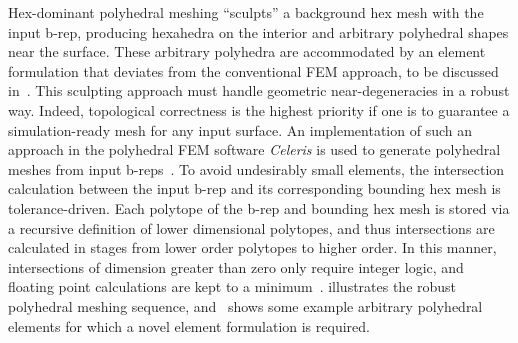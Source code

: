 Hex-dominant polyhedral meshing ``sculpts'' a background hex mesh with the input b-rep, producing hexahedra on the interior and arbitrary polyhedral shapes near the surface. These arbitrary polyhedra are accommodated by an element formulation that deviates from the conventional FEM approach, to be discussed in~. This sculpting approach must handle geometric near-degeneracies in a robust way. Indeed, topological correctness is the highest priority if one is to guarantee a simulation-ready mesh for any input surface. An implementation of such an approach in the polyhedral FEM software \textit{Celeris} is used to generate polyhedral meshes from input b-reps~\cite{rashid_2013}. To avoid undesirably small elements, the intersection calculation between the input b-rep and its corresponding bounding hex mesh is tolerance-driven. Each polytope of the b-rep and bounding hex mesh is stored via a recursive definition of lower dimensional polytopes, and thus intersections are calculated in stages from lower order polytopes to higher order. In this manner, intersections of dimension greater than zero only require integer logic, and floating point calculations are kept to a minimum~\cite{rashid_2013}.  illustrates the robust polyhedral meshing sequence, and~ shows some example arbitrary polyhedral elements for which a novel element formulation is required.

